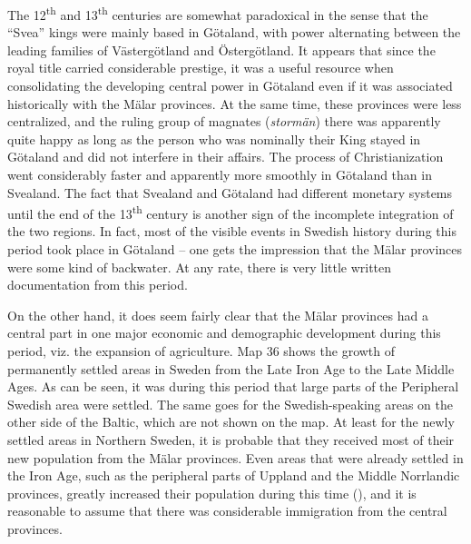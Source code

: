 \begin{styleBodytextC}
The 12\textsuperscript{th} and 13\textsuperscript{th} centuries are somewhat paradoxical in the sense that the “Svea” kings were mainly based in Götaland, with power alternating between the leading families of Västergötland and Östergötland. It appears that since the royal title carried considerable prestige, it was a useful resource when consolidating the developing central power in Götaland even if it was associated historically with the Mälar provinces. At the same time, these provinces were less centralized, and the ruling group of magnates (\textit{stormän}) there was apparently quite happy as long as the person who was nominally their King stayed in Götaland and did not interfere in their affairs. The process of Christianization went considerably faster and apparently more smoothly in Götaland than in Svealand. The fact that Svealand and Götaland had different monetary systems until the end of the 13\textsuperscript{th} century is another sign of the incomplete integration of the two regions. In fact, most of the visible events in Swedish history during this period took place in Götaland – one gets the impression that the Mälar provinces were some kind of backwater. At any rate, there is very little written documentation from this period. 

\end{styleBodytextC}

\begin{styleBodytextC}
On the other hand, it does seem fairly clear that the Mälar provinces had a central part in one major economic and demographic development during this period, viz. the expansion of agriculture. Map 36 shows the growth of permanently settled areas in Sweden from the Late Iron Age to the Late Middle Ages. As can be seen, it was during this period that large parts of the Peripheral Swedish area were settled. The same goes for the Swedish-speaking areas on the other side of the Baltic, which are not shown on the map. At least for the newly settled areas in Northern Sweden, it is probable that they received most of their new population from the Mälar provinces. Even areas that were already settled in the Iron Age, such as the peripheral parts of Uppland and the Middle Norrlandic provinces, greatly increased their population during this time (\citet{Broberg1990}), and it is reasonable to assume that there was considerable immigration from the central provinces. 

\end{styleBodytextC}

